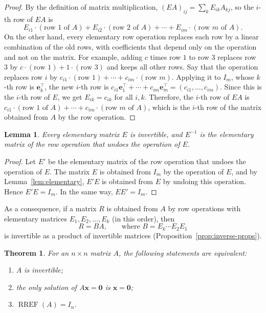 \documentclass[11pt]{article}
\theoremstyle{definition}
\theoremstyle{plain}
\newtheorem{theorem}[definition]{Theorem}
\newtheorem{lemma}[definition]{Lemma}
\theoremstyle{remark}
\DeclareMathOperator{\RREF}{RREF}
\begin{document}
\begin{proof}
    By the definition of matrix multiplication, $(EA)_{ij} = \sum_k E_{ik} A_{kj}$, so the $i$-th row of $EA$ is
    \[E_{i1} \cdot (\text{row } 1 \text{ of } A) + E_{i2} \cdot (\text{row } 2 \text{ of } A) + \cdots + E_{im} \cdot (\text{row } m \text{ of } A).\]
    On the other hand, every elementary row operation replaces each row by a linear combination of the old rows, with coefficients that depend only on the operation and not on the matrix. For example, adding $c$ times row $1$ to row $3$ replaces row $3$ by $c \cdot (\text{row } 1) + 1 \cdot (\text{row } 3)$ and keeps all other rows. Say that the operation replaces row $i$ by $c_{i1} \cdot (\text{row } 1) + \cdots + c_{im} \cdot (\text{row } m)$. Applying it to $I_m$, whose $k$-th row is $\mathbf{e}_k^\top$, the new $i$-th row is $c_{i1} \mathbf{e}_1^\top + \cdots + c_{im} \mathbf{e}_m^\top = (c_{i1}, \ldots, c_{im})$. Since this is the $i$-th row of $E$, we get $E_{ik} = c_{ik}$ for all $i, k$. Therefore, the $i$-th row of $EA$ is $c_{i1} \cdot (\text{row } 1 \text{ of } A) + \cdots + c_{im} \cdot (\text{row } m \text{ of } A)$, which is the $i$-th row of the matrix obtained from $A$ by the row operation.
\end{proof}

\begin{lemma}\label{lem:elem-inv}
    Every elementary matrix $E$ is invertible, and $E^{-1}$ is the elementary matrix of the row operation that undoes the operation of $E$.
\end{lemma}

\begin{proof}
    Let $E'$ be the elementary matrix of the row operation that undoes the operation of $E$. The matrix $E$ is obtained from $I_m$ by the operation of $E$, and by Lemma~\ref{lem:elementary}, $E'E$ is obtained from $E$ by undoing this operation. Hence $E'E = I_m$. In the same way, $EE' = I_m$.
\end{proof}

As a consequence, if a matrix $R$ is obtained from $A$ by row operations with elementary matrices $E_1, E_2, \ldots, E_k$ (in this order), then
\[R = BA, \qquad \text{where } B = E_k \cdots E_2 E_1\]
is invertible as a product of invertible matrices (Proposition~\ref{prop:inverse-props}).

\begin{theorem}\label{thm:invertible}
    For an $n \times n$ matrix $A$, the following statements are equivalent:
    \begin{enumerate}
        \item $A$ is invertible;
        \item the only solution of $A\mathbf{x} = \mathbf{0}$ is $\mathbf{x} = \mathbf{0}$;
        \item $\RREF(A) = I_n$.
    \end{enumerate}
\end{theorem}
\end{document}
